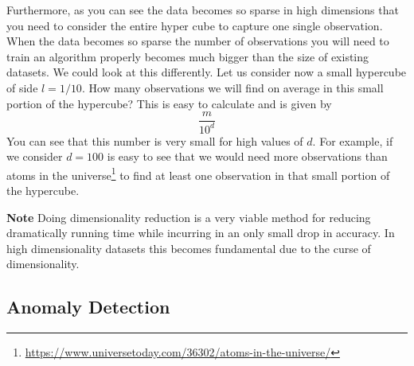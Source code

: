 \documentclass[12pt,a4]{article}
\newenvironment{note}
{\begin{mdframed}[backgroundcolor=light-gray, roundcorner=10pt,leftmargin=1, rightmargin=1, innerleftmargin=15, innertopmargin=15,innerbottommargin=15, outerlinewidth=1, linecolor=light-gray]}
{\end{mdframed}}
\begin{document}
Furthermore, as you can see the data becomes so sparse in high dimensions that you need to consider the entire hyper cube to capture one single observation. When the data becomes so sparse the number of observations you will need to train an algorithm properly becomes much bigger than the size of existing datasets. 
We could look at this differently. Let us consider now a small hypercube of side \( l = 1/10\). How many observations we will find on average in this small portion of the hypercube? This is easy to calculate and is given by
\begin{equation}
\frac{m}{10^{d}}
\end{equation}
You can see that this number is very small for high values of \( d\). For example, if we consider \( d = 100\) is easy to see that we would need more observations than atoms in the universe\footnote{\url{https://www.universetoday.com/36302/atoms-in-the-universe/} } to find at least one observation in that small portion of the hypercube.
\begin{note}
\textbf{Note }Doing dimensionality reduction is a very viable method for reducing dramatically running time while incurring in an only small drop in accuracy. In high dimensionality datasets this becomes fundamental due to the curse of dimensionality.
\end{note}
\subsection{Anomaly Detection}
\end{document}

